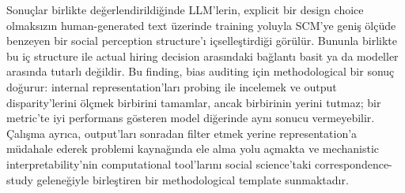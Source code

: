 \documentclass[twocolumn]{article}
\begin{document}
Sonuçlar birlikte değerlendirildiğinde LLM'lerin, explicit bir design choice
olmaksızın human-generated text üzerinde training yoluyla SCM'ye geniş ölçüde
benzeyen bir social perception structure'ı içselleştirdiği görülür. Bununla
birlikte bu iç structure ile actual hiring decision arasındaki bağlantı basit
ya da modeller arasında tutarlı değildir. Bu finding, bias auditing için
methodological bir sonuç doğurur: internal representation'ları probing ile
incelemek ve output disparity'lerini ölçmek birbirini tamamlar, ancak birbirinin
yerini tutmaz; bir metric'te iyi performans gösteren model diğerinde aynı sonucu
vermeyebilir. Çalışma ayrıca, output'ları sonradan filter etmek yerine
representation'a müdahale ederek problemi kaynağında ele alma yolu açmakta ve
mechanistic interpretability'nin computational tool'larını social science'taki
correspondence-study geleneğiyle birleştiren bir methodological template
sunmaktadır.
\end{document}
